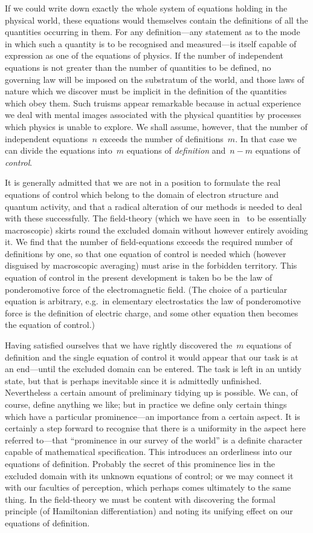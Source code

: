 \documentclass[12pt]{book}
\begin{document}
If we could write down exactly the whole system of equations holding in the physical world,
these equations would themselves contain the definitions of all the quantities occurring in them.
For any definition---any statement as to the mode in which such a quantity is to be recognised and
measured---is itself capable of expression as one of the equations of physics.
If the number of independent equations is not greater than the number of quantities to be defined,
no governing law will be imposed on the substratum of the world, and those laws of nature which we
discover must be implicit in the definition of the quantities which obey them.
Such truisms appear remarkable because in actual experience we deal with mental images associated with
the physical quantities by processes which physics is unable to explore.
We shall assume, however, that the number of independent equations~$n$ exceeds the number of definitions~$m$.
In that case we can divide the equations into~$m$ equations of \emph{definition} and~$n-m$ equations of \emph{control}.

It is generally admitted that we are not in a position to formulate the real equations of control which belong
to the domain of electron structure and quantum activity, and that a radical alteration of our methods is needed
to deal with these successfully.
The field\hyp{}theory (which we have seen in~ to be essentially macroscopic) skirts round the excluded domain
without however entirely avoiding it.
We find that the number of field\hyp{}equations exceeds the required number of definitions by one, so that one
equation of control is needed which (however disguised by macroscopic averaging) must arise in the
forbidden territory.
This equation of control in the present development is taken bo be the law of ponderomotive force of the
electromagnetic field.
(The choice of a particular equation is arbitrary, e.g.\ in elementary electrostatics the law of ponderomotive
force is the definition of electric charge, and some other equation then becomes the equation of control.)

Having satisfied ourselves that we have rightly discovered the~$m$ equations of definition and the single equation
of control it would appear that our task is at an end---until the excluded domain can be entered.
The task is left in an untidy state, but that is perhaps inevitable since it is admittedly unfinished.
Nevertheless a certain amount of preliminary tidying up is possible.
We can, of course, define anything we like; but in practice we define only certain things which have a
particular prominence---an importance from a certain aspect.
It is certainly a step forward to recognise that there is a uniformity in the aspect here referred to---that
``prominence in our survey of the world'' is a definite character capable of mathematical specification.
This introduces an orderliness into our equations of definition.
Probably the secret of this prominence lies in the excluded domain with its unknown equations of control;
or we may connect it with our faculties of perception, which perhaps comes ultimately to the same thing.
In the field\hyp{}theory we must be content with discovering the formal principle (of Hamiltonian differentiation)
and noting its unifying effect on our equations of definition.
\end{document}
